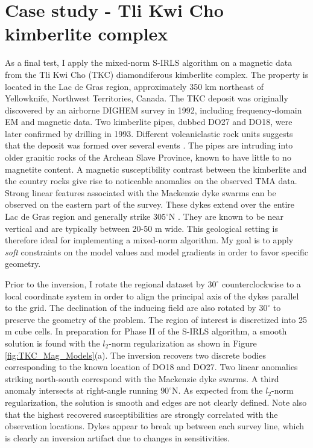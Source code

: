 \section{Case study - Tli Kwi Cho kimberlite complex}\label{3D_Section}
As a final test, I apply the mixed-norm S-IRLS algorithm on a magnetic data from the Tli Kwi Cho (TKC) diamondiferous kimberlite complex.
The property is located in the Lac de Gras region,  approximately 350 km northeast of Yellowknife, Northwest Territories, Canada.
The TKC deposit was originally discovered by an airborne DIGHEM survey in 1992, including frequency-domain EM and magnetic data. 
Two kimberlite pipes, dubbed DO27 and DO18, were later confirmed by drilling in 1993.  
Different volcaniclastic rock units suggests that the deposit was formed over several events \cite[]{DoyleEtAl1999}. 
The pipes are intruding into older granitic rocks of the Archean Slave Province, known to have little to no magnetite content.
A magnetic susceptibility contrast between the kimberlite and the country rocks give rise to noticeable anomalies on the observed TMA data.
Strong linear features associated with the Mackenzie dyke swarms can be observed on the eastern part of the survey.
These dykes extend over the entire Lac de Gras region and generally strike $305^\circ$N \cite[]{Wilkinson2001}. 
They are known to be near vertical and are typically between 20-50 m wide. 
This geological setting is therefore ideal for implementing a mixed-norm algorithm. 
My goal is to apply \emph{soft} constraints on the model values and model gradients in order to favor specific geometry. 

Prior to the inversion, I rotate the regional dataset by $30^{\circ}$ counterclockwise to a local coordinate system in order to align the principal axis of the dykes parallel to the grid. 
The declination of the inducing field are also rotated by $30^\circ$ to preserve the geometry of the problem.
The region of interest is discretized into 25 m cube cells.
In preparation for Phase II of the S-IRLS algorithm, a smooth solution is found with the $l_2$-norm regularization as shown in Figure \ref{fig:TKC_Mag_Models}(a).
The inversion recovers two discrete bodies corresponding to the known location of DO18 and DO27.
Two linear anomalies striking north-south correspond with the Mackenzie dyke swarms. A third anomaly intersects at right-angle running $90^{\circ}$N.
As expected from the $l_2$-norm regularization, the solution is smooth and edges are not clearly defined.
Note also that the highest recovered susceptibilities are strongly correlated with the observation locations.
Dykes appear to break up between each survey line, which is clearly an inversion artifact due to changes in sensitivities. 

